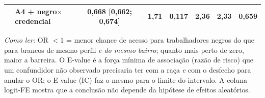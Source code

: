 \begin{table}[!ht]
{\begin{tabular}{llcccccc}
 & A4 + negro$\times$credencial & 0,668 [0,662; 0,674] & −1,71 & 0,117 & 2,36 & 2,33 & 0,659 \\
\bottomrule
\end{tabular}}
\par\smallskip
\footnotesize\emph{Como ler:} OR $<1$ = menor chance de acesso para trabalhadores negros do que para brancos de mesmo perfil \emph{e do mesmo bairro}; quanto mais perto de zero, maior a barreira. O E-value é a força mínima de associação (razão de risco) que um confundidor não observado precisaria ter com a raça \emph{e} com o desfecho para anular o OR; o E-value (IC) faz o mesmo para o limite do intervalo. A coluna logit-FE mostra que a conclusão não depende da hipótese de efeitos aleatórios.
\end{table}
